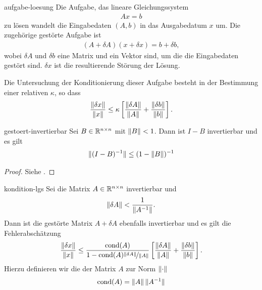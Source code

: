 \begin{Definition}{aufgabe-loesung}
  Die Aufgabe, das lineare Gleichungssystem
  \begin{gather}
    Ax=b
  \end{gather}
  zu lösen wandelt die Eingabedaten $(A,b)$ in das Ausgabedatum $x$
  um. Die zugehörige gestörte Aufgabe ist
  \begin{gather}
    (A+\delta A) (x+\delta x) = b+ \delta b,
  \end{gather}
  wobei $\delta A$ und $\delta b$ eine Matrix und ein Vektor sind, um
  die die Eingabedaten gestört sind. $\delta x$ ist die resultierende
  Störung der Lösung.
  
  Die Untersuchung der Konditionierung dieser Aufgabe besteht in
  der Bestimmung einer relativen  $\kappa$, so dass
  \begin{gather}
    \frac{\lVert\delta x\rVert}{\lVert x\rVert}
    \le \kappa \left[\frac{\lVert\delta A\rVert}{\lVert A\rVert}
      +\frac{\lVert\delta b\rVert}{\lVert b\rVert}\right].
  \end{gather}
\end{Definition}

\begin{Lemma}{gestoert-invertierbar}
  Sei $B\in \mathbb R^{n\times n}$ mit $\lVert B\rVert < 1$. Dann ist $I-B$
  invertierbar und es gilt
  \begin{gather}
    \lVert(I-B)^{-1}\rVert \le (1-\lVert B\rVert)^{-1}
  \end{gather}
\end{Lemma}

\begin{proof}
  Siehe \cite[Hilfssatz 4.4]{Rannacher17}.
\end{proof}

\begin{Satz}{kondition-lgs}
  Sei die Matrix $A\in\mathbb R^{n\times n}$ invertierbar und
  \begin{gather}
    \label{eq:la1:1}
    \lVert\delta A\rVert < \frac1{\lVert A^{-1}\rVert}.
  \end{gather}
  Dann ist die gestörte Matrix $A+\delta A$ ebenfalls invertierbar und
  es gilt die Fehlerabschätzung
  \begin{gather}
    \frac{\lVert\delta x\rVert}{\lVert x\rVert}
    \le \frac{\operatorname{cond}(A)}{1-\operatorname{cond}(A)\nicefrac{\lVert\delta A\rVert}{{\lVert A\rVert}}}
    \left[\frac{\lVert\delta A\rVert}{\lVert A\rVert}
      +\frac{\lVert\delta b\rVert}{\lVert b\rVert}\right].
  \end{gather}
  Hierzu definieren wir die  der Matrix $A$ zur
  Norm $\lVert\cdot\rVert$
  \begin{gather}
    \operatorname{cond}(A) = \lVert A\rVert \,\lVert A^{-1}\rVert
  \end{gather}
\end{Satz}

